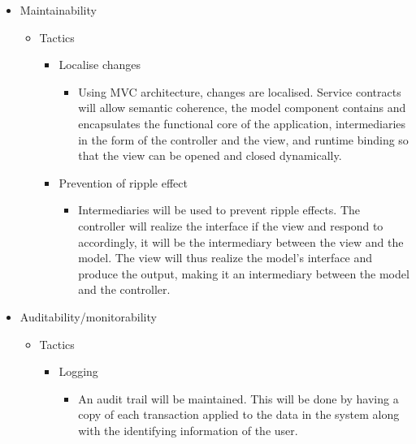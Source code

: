 \documentclass{article}
\begin{document}
\begin{itemize}
\begin{itemize}
\begin{itemize}
			\end{itemize}			
			
		\end{itemize}
		
		\item Maintainability
		\begin{itemize}
			
			\item Tactics
			\begin{itemize}
				\item Localise changes
					\begin{itemize}
						\item Using MVC architecture, changes are localised. Service contracts will allow semantic coherence, the model component contains and encapsulates the functional core of the application, intermediaries in the form of the controller and the view, and runtime binding so that the view can be opened and closed dynamically.
					\end{itemize}
					
				\item Prevention of ripple effect 
				
					\begin{itemize}
						\item Intermediaries will be used to prevent ripple effects. The controller will realize the interface if the view and respond to accordingly, it will be the intermediary between the view and the model. The view will thus realize the model's interface and produce the output, making it an intermediary between the model and the controller.
					\end{itemize}

			\end{itemize}			
			
		\end{itemize}
		\item Auditability/monitorability
		\begin{itemize}
			
			\item Tactics
			\begin{itemize}
				\item Logging
					\begin{itemize}
						\item An audit trail will be maintained. This will be done by having a copy of each transaction applied to the data in the system along with the identifying information of the user.
					\end{itemize}					
			\end{itemize}			
			

\end{itemize}
\end{itemize}
\end{document}
